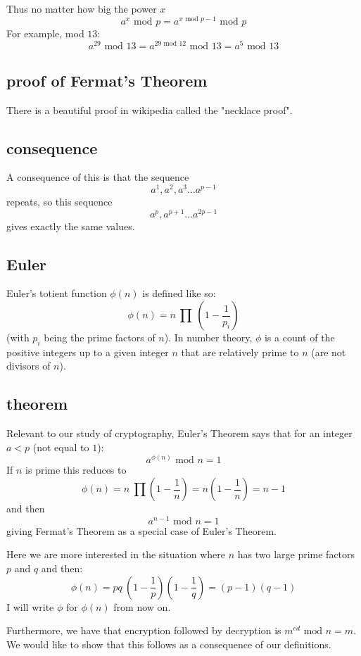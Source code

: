 \documentclass[11pt, oneside]{article}
\begin{document}
Thus no matter how big the power $x$
\[ a^x \text{ mod } p = a^{x \text{ mod } p-1} \text{ mod } p \]
For example, mod $13$:
\[ a^{29} \text{ mod } 13 = a^{29 \text{ mod } 12} \text{ mod } 13 = a^5  \text{ mod } 13 \]

\subsection*{proof of Fermat's Theorem}

There is a beautiful proof in wikipedia called the "necklace proof".

\subsection*{consequence}

A consequence of this is that the sequence
\[ a^1, a^2, a^3 \dots a^{p-1} \]
repeats, so this sequence
\[ a^{p}, a^{p+1} \dots a^{2p - 1} \]
gives exactly the same values.

\subsection*{Euler}
Euler's totient function $\phi(n)$ is defined like so:
\[ \phi(n) = n \ \prod \ (1 - \frac{1}{p_i}) \]
(with $p_i$ being the prime factors of $n$).  In number theory, $\phi$ is a count of the positive integers up to a given integer $n$ that are relatively prime to $n$ (are not divisors of $n$).

\subsection*{theorem}
Relevant to our study of cryptography, Euler's Theorem says that for an integer $a < p$ (not equal to $1$):
\[ a^{\phi(n)} \text{ mod } n = 1 \]
If $n$ is prime this reduces to 
\[ \phi(n) = n \ \prod (1 - \frac{1}{n}) =  n(1 -  \frac{1}{n}) = n - 1 \]
and then
\[ a^{n-1} \text{ mod } n = 1 \]
giving Fermat's Theorem as a special case of Euler's Theorem.

Here we are more interested in the situation where $n$ has two large prime factors $p$ and $q$ and then:
\[ \phi(n) = pq \ (1 - \frac{1}{p}) (1 - \frac{1}{q}) = (p - 1)(q - 1)  \]
I will write $\phi$ for $\phi(n)$ from now on.

Furthermore, we have that encryption followed by decryption is $m^{ed} \text{ mod } n = m$.  We would like to show that this follows as a consequence of our definitions.  
\end{document}

